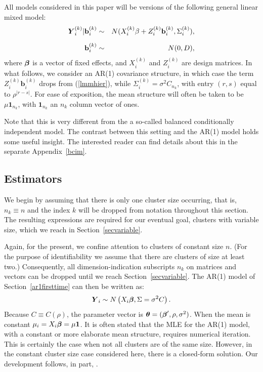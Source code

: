 \documentclass[11pt,a5paper,twoside]{book}
\newcommand{\bftheta}{\mbox{\boldmath $\theta$}}
\newcommand{\BY}{\mbox{\boldmath $Y$}}
\newcommand{\Zik}{\mbox{$Z_i^{(k)}$}}
\newcommand{\bfbeta}{\mbox{\boldmath $\beta$}}
\begin{document}
All models considered in this paper will be versions of the following general linear mixed model:
\begin{eqnarray}
\BY_i^{(k)}|\mathbf{b}_i^{(k)}&\sim&N(X_i^{(k)}\mathbf{\beta}+Z_i^{(k)}\mathbf{b}_i^{(k)},\Sigma_i^{(k)}),\label{lmmhier}\\[2mm]
\mathbf{b}_i^{(k)}&\sim&N(0,D),\label{lmmprior}
\end{eqnarray}
where $\bfbeta$ is a vector of fixed effects, and $X_i^{(k)}$ and $Z_i^{(k)}$ are design matrices. In what follows, we consider an AR(1) covariance structure, in which case
the term $\Zik\mathbf{b}_i^{(k)}$ drops\label{ar1firsttime} from (\ref{lmmhier}), while $\Sigma_i^{(k)}=\sigma^2C_{n_k}$, with entry $(r,s)$ equal to $\rho^{|r-s|}$. For ease of exposition, the mean structure will often be taken to be $\mu\mathbf{1}_{n_k}$, with $\mathbf{1}_{n_k}$ an $n_k$ column vector of ones.

Note that this is very different from the a so-called balanced conditionally independent model.\label{defsetting1} The contrast between this setting and the AR(1) model holds some useful insight. The interested reader can find details about this in the separate Appendix~\ref{bcim}. 





\subsection{Estimators}
\label{secestimators}


We begin by assuming that there is only one cluster size occurring, that is, $n_k\equiv n$ and the index $k$ will be dropped from notation throughout this section. The resulting expressions are required for our eventual goal, clusters with variable size, which we reach in Section~\ref{secvariable}.

Again, for the present, we confine attention to clusters of constant size $n$. (For the purpose of identifiability we assume that there are clusters of size at least two.) Consequently, all dimension-indication subscripts $n_k$ on matrices and vectors can be dropped until we reach Section~\ref{secvariable}. The AR(1) model of Section~\ref{ar1firsttime} can then be written as:
$$\BY_i\sim N\left(X_i\bfbeta,\Sigma=\sigma^2C\right).$$
Because $C\equiv C(\rho)$, the parameter vector is $\bftheta=(\bfbeta',\rho,\sigma^2)$.
When the mean is constant $\mathbf{\mu}_i=X_i\bfbeta=\mu\mathbf{1}$. It is often stated that the MLE for the AR(1) model, with a constant or more elaborate mean structure, requires numerical iteration. This is certainly the case when not all clusters are of the same size. However, in the constant cluster size case considered here, there is a closed-form solution. Our development follows, in part, \cite{K81}.
\end{document}
